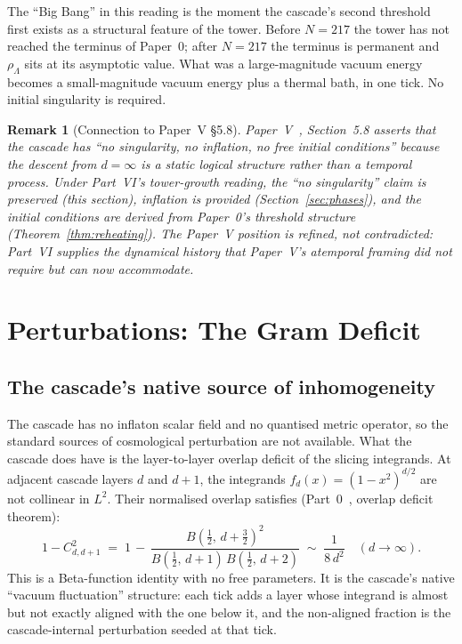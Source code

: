 \documentclass[12pt,a4paper]{article}
\newtheorem*{remark}{Remark}
\begin{document}
The ``Big Bang'' in this reading is the moment the cascade's second threshold
first exists as a structural feature of the tower. Before $N = 217$ the tower
has not reached the terminus of Paper~0; after $N = 217$ the terminus is
permanent and $\rho_\Lambda$ sits at its asymptotic value. What was a
large-magnitude vacuum energy becomes a small-magnitude vacuum energy plus a
thermal bath, in one tick. No initial singularity is required.

\begin{remark}[Connection to Paper~V \S5.8]
Paper~V~\cite{part5}, Section~5.8 asserts that the cascade has ``no
singularity, no inflation, no free initial conditions'' because the descent
from $d = \infty$ is a static logical structure rather than a temporal process.
Under Part~VI's tower-growth reading, the ``no singularity'' claim is preserved
(this section), inflation is provided (Section~\ref{sec:phases}), and the
initial conditions are derived from Paper~0's threshold structure
(Theorem~\ref{thm:reheating}). The Paper~V position is refined, not
contradicted: Part~VI supplies the dynamical history that Paper~V's atemporal
framing did not require but can now accommodate.
\end{remark}

\section{Perturbations: The Gram Deficit}
\label{sec:perturbations}

\subsection{The cascade's native source of inhomogeneity}

The cascade has no inflaton scalar field and no quantised metric operator, so
the standard sources of cosmological perturbation are not available. What the
cascade does have is the layer-to-layer overlap deficit of the slicing
integrands. At adjacent cascade layers $d$ and $d+1$, the integrands
$f_d(x) = (1-x^2)^{d/2}$ are not collinear in $L^2$. Their normalised overlap
satisfies (Part~0~\cite{part0}, overlap deficit theorem):
\[
1 - C_{d,d+1}^2 \;=\; 1 \,-\, \frac{B\!\left(\frac{1}{2},\, d + \frac{3}{2}\right)^2}
{B\!\left(\frac{1}{2},\, d + 1\right)\,B\!\left(\frac{1}{2},\, d + 2\right)}
\;\sim\; \frac{1}{8\,d^2}
\quad (d \to \infty).
\]
This is a Beta-function identity with no free parameters. It is the cascade's
native ``vacuum fluctuation'' structure: each tick adds a layer whose integrand
is almost but not exactly aligned with the one below it, and the non-aligned
fraction is the cascade-internal perturbation seeded at that tick.
\end{document}
